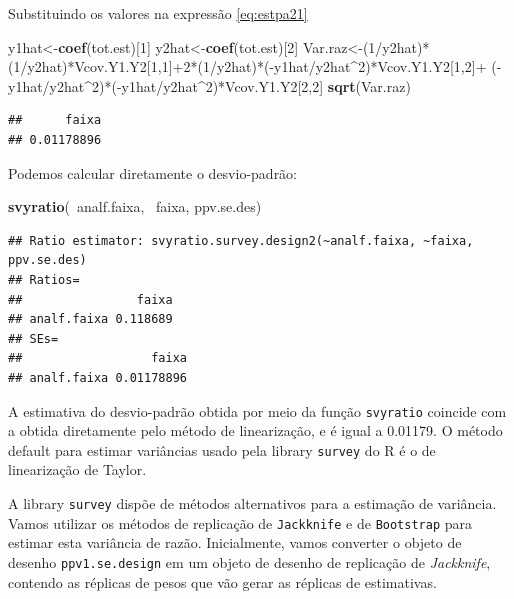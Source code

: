 \documentclass[]{book}
\newenvironment{Shaded}{\begin{snugshade}}{\end{snugshade}}
\newcommand{\KeywordTok}[1]{\textcolor[rgb]{0.13,0.29,0.53}{\textbf{{#1}}}}
\newcommand{\DecValTok}[1]{\textcolor[rgb]{0.00,0.00,0.81}{{#1}}}
\newcommand{\NormalTok}[1]{{#1}}
\numberwithin{example}{chapter}
\numberwithin{remark}{chapter}
\numberwithin{definition}{chapter}
\begin{document}
Substituindo os valores na expressão \eqref{eq:estpa21}

\begin{Shaded}
\begin{Highlighting}[]
\NormalTok{y1hat<-}\KeywordTok{coef}\NormalTok{(tot.est)[}\DecValTok{1}\NormalTok{]}
\NormalTok{y2hat<-}\KeywordTok{coef}\NormalTok{(tot.est)[}\DecValTok{2}\NormalTok{]}
\NormalTok{Var.raz<-(}\DecValTok{1}\NormalTok{/y2hat)*(}\DecValTok{1}\NormalTok{/y2hat)*Vcov.Y1.Y2[}\DecValTok{1}\NormalTok{,}\DecValTok{1}\NormalTok{]+}\DecValTok{2}\NormalTok{*(}\DecValTok{1}\NormalTok{/y2hat)*(-y1hat/y2hat^}\DecValTok{2}\NormalTok{)*Vcov.Y1.Y2[}\DecValTok{1}\NormalTok{,}\DecValTok{2}\NormalTok{]+}
\NormalTok{(-y1hat/y2hat^}\DecValTok{2}\NormalTok{)*(-y1hat/y2hat^}\DecValTok{2}\NormalTok{)*Vcov.Y1.Y2[}\DecValTok{2}\NormalTok{,}\DecValTok{2}\NormalTok{]}
\KeywordTok{sqrt}\NormalTok{(Var.raz)}
\end{Highlighting}
\end{Shaded}

\begin{verbatim}
##      faixa 
## 0.01178896
\end{verbatim}

Podemos calcular diretamente o desvio-padrão:

\begin{Shaded}
\begin{Highlighting}[]
\KeywordTok{svyratio}\NormalTok{(~analf.faixa, ~faixa, ppv.se.des)}
\end{Highlighting}
\end{Shaded}

\begin{verbatim}
## Ratio estimator: svyratio.survey.design2(~analf.faixa, ~faixa, ppv.se.des)
## Ratios=
##                faixa
## analf.faixa 0.118689
## SEs=
##                  faixa
## analf.faixa 0.01178896
\end{verbatim}

A estimativa do desvio-padrão obtida por meio da função
\texttt{svyratio} coincide com a obtida diretamente pelo método de
linearização, e é igual a 0.01179. O método default para estimar
variâncias usado pela library \texttt{survey} do R é o de linearização
de Taylor.

A library \texttt{survey} dispõe de métodos alternativos para a
estimação de variância. Vamos utilizar os métodos de replicação de
\texttt{Jackknife} e de \texttt{Bootstrap} para estimar esta variância
de razão. Inicialmente, vamos converter o objeto de desenho
\texttt{ppv1.se.design} em um objeto de desenho de replicação de
\emph{Jackknife}, contendo as réplicas de pesos que vão gerar as
réplicas de estimativas.
\end{document}
